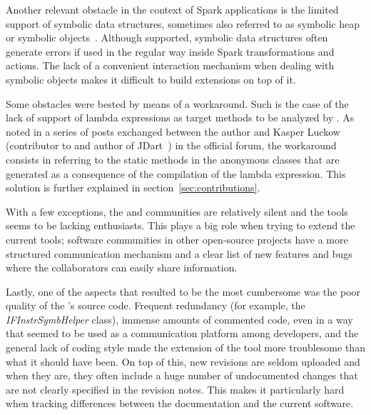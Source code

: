 Another relevant obstacle in the context of Spark applications is the limited support of symbolic data structures, sometimes also referred to as symbolic heap or symbolic objects~\cite{Pasareanu2010}. Although supported, symbolic data structures often generate errors if used in the regular way inside Spark transformations and actions. The lack of a convenient interaction mechanism when dealing with symbolic objects makes it difficult to build extensions on top of it.

Some obstacles were bested by means of a workaround. Such is the case of the lack of support of lambda expressions as target methods to be analyzed by \spf{}. As noted in a series of posts exchanged between the author and Kasper Luckow (contributor to \spf{} and author of JDart~\cite{Luckow2016}) in the official \jpf{} forum, the workaround consists in referring to the static methods in the anonymous classes that are generated as a consequence of the compilation of the lambda expression. This solution is further explained in section~\ref{sec:contributions}.

With a few exceptions, the \jpf{} and \spf{} communities are relatively silent and the tools seems to be lacking enthusiasts. This plays a big role when trying to extend the current tools; software communities in other open-source projects have a more structured communication mechanism and a clear list of new features and bugs where the collaborators can easily share information.

Lastly, one of the aspects that resulted to be the most cumbersome was the poor quality of the \spf{}'s source code. Frequent redundancy (for example, the \textit{IFInstrSymbHelper} class), immense amounts of commented code, even in a way that seemed to be used as a communication platform among developers, and the general lack of coding style made the extension of the tool more troublesome than what it should have been. On top of this, new revisions are seldom uploaded and when they are, they often include a huge number of undocumented changes that are not clearly specified in the revision notes. This makes it particularly hard when tracking differences between the documentation and the current software.